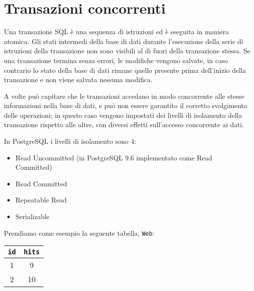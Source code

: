 \documentclass[a4paper, 10pt, titlepage]{article}
\begin{document}
	\newpage
	
		\section{Transazioni concorrenti}
	Una transazione SQL è una sequenza di istruzioni ed è eseguita in maniera atomica.
	Gli stati intermedi della base di dati durante l'esecuzione della serie di istruzioni della transazione non sono visibili al di fuori della transazione stessa.
	Se una transazione termina senza errori, le modifiche vengono salvate, in caso contrario lo stato della base di dati rimane quello presente prima dell'inizio della transazione e non viene salvata nessuna modifica.
	
	A volte può capitare che le transazioni accedano in modo concorrente alle stesse informazioni nella base di dati, e può non essere garantito il corretto svolgimento delle operazioni; in questo caso vengono impostati dei livelli di isolamento della transazione rispetto alle altre, con diversi effetti sull'accesso concorrente ai dati.
	
	In PostgreSQL i livelli di isolamento sono 4:
		\begin{itemize}
			\item Read Uncommitted (in PostgreSQL 9.6 implementato come Read Committed)
			\item Read Committed
			\item Repeatable Read
			\item Serializable	
		\end{itemize}
		Prendiamo come esempio la seguente tabella, 
		\lstinline|Web|:
		\begin{tabular}{cc}
			\toprule
			\lstinline|id| & \lstinline|hits| \\
			\midrule
			1 & 9 \\
			2 & 10 \\
			\midrule
		\end{tabular}
		
\end{document}
